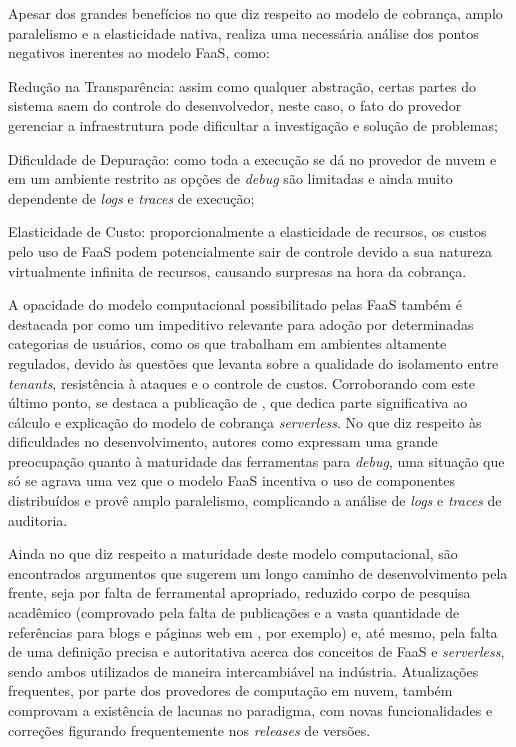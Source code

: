 \documentclass[english,brazilian]{UNISINOSmonografia} %
\begin{document}
Apesar dos grandes benefícios no que diz respeito ao modelo de cobrança, amplo paralelismo e a elasticidade nativa,  realiza uma necessária análise dos pontos negativos inerentes ao modelo FaaS, como: 
\begin{inparaenum} 
	\item Redução na Transparência: assim como qualquer abstração, certas partes do sistema saem do controle do desenvolvedor, neste caso, o fato do provedor gerenciar a infraestrutura pode dificultar a investigação e solução de problemas;
	\item Dificuldade de Depuração: como toda a execução se dá no provedor de nuvem e em um ambiente restrito as opções de \textit{debug} são limitadas e ainda muito dependente de \textit{logs} e \textit{traces} de execução;
	\item Elasticidade de Custo: proporcionalmente a elasticidade de recursos, os custos pelo uso de FaaS podem potencialmente sair de controle devido a sua natureza virtualmente infinita de recursos, causando surpresas na hora da cobrança.
\end{inparaenum}


A opacidade do modelo computacional possibilitado pelas FaaS também é destacada por  como um impeditivo relevante para adoção por determinadas categorias de usuários, como os que trabalham em ambientes altamente regulados, devido às questões que levanta sobre a qualidade do isolamento entre \textit{tenants}, resistência à ataques e o controle de custos.
Corroborando com este último ponto, se destaca a publicação de , que dedica parte significativa ao cálculo e explicação do modelo de cobrança \textit{serverless}.
No que diz respeito às dificuldades no desenvolvimento, autores como  expressam uma grande preocupação quanto à maturidade das ferramentas para \textit{debug}, uma situação que só se agrava uma vez que o modelo FaaS incentiva o uso de componentes distribuídos e provê amplo paralelismo, complicando a análise de \textit{logs} e \textit{traces} de auditoria.


Ainda no que diz respeito a maturidade deste modelo computacional, são encontrados argumentos que sugerem um longo caminho de desenvolvimento pela frente, seja por falta de ferramental apropriado, reduzido corpo de pesquisa acadêmico (comprovado pela falta de publicações e a vasta quantidade de referências para blogs e páginas web em \cite{Wang2018}, por exemplo) e, até mesmo, pela falta de uma definição precisa e autoritativa acerca dos conceitos de FaaS e \textit{serverless}, sendo ambos utilizados de maneira intercambiável na indústria.
Atualizações frequentes, por parte dos provedores de computação em nuvem, também comprovam a existência de lacunas no paradigma, com novas funcionalidades e correções figurando frequentemente nos \textit{releases} de versões.
\end{document}
